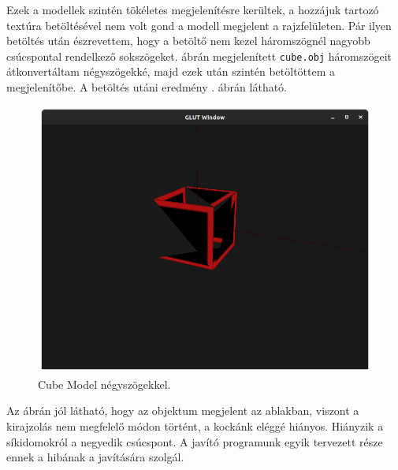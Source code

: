 Ezek a modellek szintén tökéletes megjelenítésre kerültek, a hozzájuk tartozó textúra betöltésével nem volt gond a modell megjelent a rajzfelületen.
\newpage
Pár ilyen betöltés után észrevettem, hogy a betöltő nem kezel háromszögnél nagyobb csúcspontal rendelkező sokszögeket.  ábrán megjelenített \texttt{cube.obj} háromszögeit átkonvertáltam négyszögekké, majd ezek után szintén betöltöttem a megjelenítőbe. A betöltés utáni eredmény . ábrán látható.

\begin{figure}[h]
\centering
\includegraphics[width=\textwidth]{images/Model_quads.png}
\caption{Cube Model négyszögekkel.}
\label{fig:model2}
\end{figure}

Az ábrán jól látható, hogy az objektum megjelent az ablakban, viszont a kirajzolás nem megfelelő módon történt, a kockánk eléggé hiányos. Hiányzik a síkidomokról a negyedik csúcspont. A javító programunk egyik tervezett része ennek a hibának a javítására szolgál.
